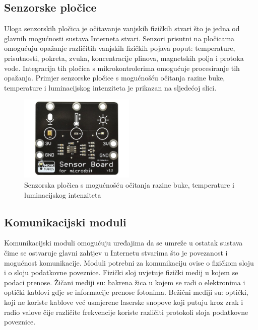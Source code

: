 \documentclass[times, utf8, diplomski]{fer}
\begin{document}
\subsection{Senzorske pločice}
Uloga senzorskih pločica je očitavanje vanjskih fizičkih stvari što je jedna od glavnih mogućnosti sustava Interneta stvari. Senzori prisutni na pločicama omogućuju opažanje različitih vanjskih fizičkih pojava poput: temperature, prisutnosti, pokreta, zvuka, koncentracije plinova, magnetskih polja i protoka vode. Integracija tih pločica s mikrokontrolerima omogućuje procesiranje tih opažanja. Primjer senzorske pločice s mogućnošću očitanja razine buke, temperature i luminacijskog intenziteta je prikazan na sljedećoj slici.
\begin{figure}[htb]
    \centering
    \includegraphics[width=5.5cm]{images/sensor_board.jpg}
    \caption{Senzorska pločica s mogućnošću očitanja razine buke, temperature i luminacijskog intenziteta\citep{SensorBoard}}
    \label{fig:sensorboard}
\end{figure}

\subsection{Komunikacijski moduli}
Komunikacijski moduli omogućuju uređajima da se umreže u ostatak sustava čime se ostvaruje glavni zahtjev u Internetu stvarima što je povezanost i mogućnost komunikacije. Moduli potrebni za komunikaciju ovise o fizičkom sloju i o sloju podatkovne poveznice. Fizički sloj uvjetuje fizički medij u kojem se podaci prenose. Žičani mediji su: bakrena žica u kojem se radi o elektronima i optički kablovi gdje se informacije prenose fotonima. Bežični mediji su: optički, koji ne koriste kablove već usmjerene laserske snopove koji putuju kroz zrak i radio valove čije različite frekvencije koriste različiti protokoli sloja podatkovne poveznice. 
\end{document}
